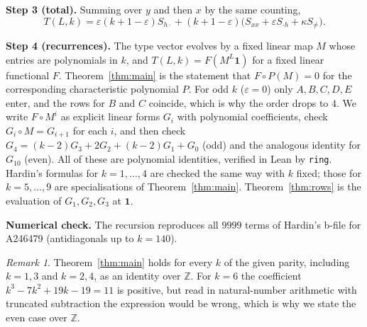 \documentclass[11pt]{article}
\theoremstyle{remark}\newtheorem{remark}[theorem]{Remark}
\begin{document}
\textbf{Step 3 (total).} Summing over $y$ and then $x$ by the same counting,
\[T(L,k)=\varepsilon(k+1-\varepsilon)S_{h\cdot}+(k+1-\varepsilon)\bigl(S_{xx}+\varepsilon S_{\cdot h}+\kappa S_{\neq}\bigr).\]

\textbf{Step 4 (recurrences).} The type vector evolves by a fixed linear map $M$ whose entries are polynomials in $k$, and $T(L,k)=F(M^L\mathbf 1)$ for a fixed linear functional $F$. Theorem~\ref{thm:main} is the statement that $F\circ P(M)=0$ for the corresponding characteristic polynomial $P$. For odd $k$ ($\varepsilon=0$) only $A,B,C,D,E$ enter, and the rows for $B$ and $C$ coincide, which is why the order drops to $4$. We write $F\circ M^i$ as explicit linear forms $G_i$ with polynomial coefficients, check $G_i\circ M=G_{i+1}$ for each $i$, and then check $G_4=(k-2)G_3+2G_2+(k-2)G_1+G_0$ (odd) and the analogous identity for $G_{10}$ (even). All of these are polynomial identities, verified in Lean by \texttt{ring}. Hardin's formulas for $k=1,\dots,4$ are checked the same way with $k$ fixed; those for $k=5,\dots,9$ are specialisations of Theorem~\ref{thm:main}. Theorem~\ref{thm:rows} is the evaluation of $G_1,G_2,G_3$ at $\mathbf 1$.

\textbf{Numerical check.} The recursion reproduces all $9999$ terms of Hardin's b-file for A246479 (antidiagonals up to $k=140$).

\begin{remark}
Theorem~\ref{thm:main} holds for every $k$ of the given parity, including $k=1,3$ and $k=2,4$, as an identity over $\mathbb Z$. For $k=6$ the coefficient $k^3-7k^2+19k-19=11$ is positive, but read in natural-number arithmetic with truncated subtraction the expression would be wrong, which is why we state the even case over $\mathbb Z$.
\end{remark}
\end{document}
